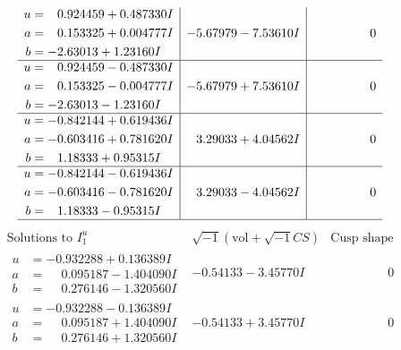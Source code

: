 \documentclass[1p]{elsarticle_modified}
\theoremstyle{definition}
\newcommand{\I}{\sqrt{-1}}
\begin{document}
$$\begin{array}{c|c|c}
\begin{aligned}
u &= \phantom{-}0.924459 + 0.487330 I \\
a &= \phantom{-}0.153325 + 0.004777 I \\
b &= -2.63013 + 1.23160 I\end{aligned}
 & -5.67979 - 7.53610 I & \phantom{-0.000000 } 0 \\ \hline\begin{aligned}
u &= \phantom{-}0.924459 - 0.487330 I \\
a &= \phantom{-}0.153325 - 0.004777 I \\
b &= -2.63013 - 1.23160 I\end{aligned}
 & -5.67979 + 7.53610 I & \phantom{-0.000000 } 0 \\ \hline\begin{aligned}
u &= -0.842144 + 0.619436 I \\
a &= -0.603416 + 0.781620 I \\
b &= \phantom{-}1.18333 + 0.95315 I\end{aligned}
 & \phantom{-}3.29033 + 4.04562 I & \phantom{-0.000000 } 0 \\ \hline\begin{aligned}
u &= -0.842144 - 0.619436 I \\
a &= -0.603416 - 0.781620 I \\
b &= \phantom{-}1.18333 - 0.95315 I\end{aligned}
 & \phantom{-}3.29033 - 4.04562 I & \phantom{-0.000000 } 0\\
 \hline 
 \end{array}$$\newpage$$\begin{array}{c|c|c}  
\text{Solutions to }I^u_{1}& \I (\text{vol} + \sqrt{-1}CS) & \text{Cusp shape}\\
 \hline 
\begin{aligned}
u &= -0.932288 + 0.136389 I \\
a &= \phantom{-}0.095187 - 1.404090 I \\
b &= \phantom{-}0.276146 - 1.320560 I\end{aligned}
 & -0.54133 - 3.45770 I & \phantom{-0.000000 } 0 \\ \hline\begin{aligned}
u &= -0.932288 - 0.136389 I \\
a &= \phantom{-}0.095187 + 1.404090 I \\
b &= \phantom{-}0.276146 + 1.320560 I\end{aligned}
 & -0.54133 + 3.45770 I & \phantom{-0.000000 } 0 \\ \hline\begin{aligned}

\end{aligned}
\end{array}$$
\end{document}
